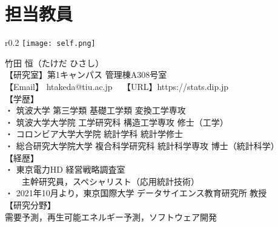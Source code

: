 \newcommand{\Release}{}
\newcommand{\Slide}{}
\newcommand{\PrintLecture}{1}
\newcommand{\PrintSolution}{1}





\AtBeginSection[]{}
\subtitle{}
\date{}




\maketitle

\section{担当教員}

{

  \begin{wrapfigure}{r}{0.2\textwidth}
    \vspace{-10mm}
    \hfill
    \texttt{[image: self.png]}
  \end{wrapfigure}

  \Large 竹田 恒（たけだ ひさし）\small\\[3mm]

  \noindent
  【研究室】第1キャンパス 管理棟A308号室\\[3mm]

  \noindent
  【Email】 htakeda@tiu.ac.jp ~
  【URL】https://stats.dip.jp\\[3mm]

  \noindent
  【学歴】\\
  ・ 筑波大学 第三学類 基礎工学類 変換工学専攻\\
  ・ 筑波大学大学院 工学研究科 構造工学専攻 修士（工学）\\
  ・ コロンビア大学大学院 統計学科 統計学修士\\
  ・ 総合研究大学院大学 複合科学研究科 統計科学専攻 博士（統計科学）\\[3mm]

  \noindent
  【経歴】\\
  ・ 東京電力HD 経営戦略調査室\\
  　　主幹研究員，スペシャリスト（応用統計技術）\\
  ・ 2021年10月より，東京国際大学 データサイエンス教育研究所 教授\\[3mm]

  \noindent
  【研究分野】\\
  需要予測，再生可能エネルギー予測，ソフトウェア開発
}

